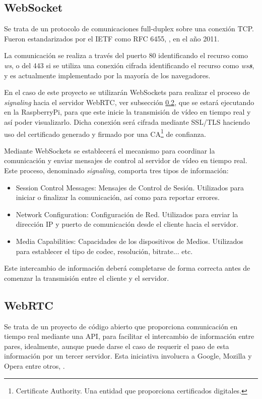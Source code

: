 \subsection{WebSocket}
\label{subsec:WebSocket}
Se trata de un protocolo de comunicaciones full-duplex sobre una conexión TCP. Fueron estandarizados por el IETF como RFC 6455, \citep{wiki:WebSocket6455, wiki:WebSocketWiki}, en el año 2011.  

La comunicación se realiza a través del puerto 80 identificando el recurso como \textit{ws}, o del 443 si se utiliza una conexión cifrada  identificando el recurso como \textit{ws\textbf{s}}, y es actualmente implementado por la mayoría de los navegadores. 

En el caso de este proyecto se utilizarán WebSockets para realizar el proceso de \textit{signaling} hacia el servidor WebRTC, ver subsección \ref{subsec:WebRTC}, que se estará ejecutando en la RaspberryPi, para que este inicie la transmisión de vídeo en tiempo real y así poder visualizarlo. Dicha conexión será cifrada mediante SSL/TLS haciendo uso del certificado generado y firmado por una CA\footnote{Certificate Authority. Una entidad que proporciona certificados digitales.} de confianza.

Mediante WebSockets se establecerá el mecanismo para coordinar la comunicación y enviar mensajes de control al servidor de vídeo en tiempo real. Este proceso, denominado \textit{signaling}, comporta tres tipos de información:
\begin{itemize}
\item Session Control Messages: Mensajes de Control de Sesión. Utilizados para iniciar o finalizar la comunicación, así como para reportar errores.
\item Network Configuration: Configuración de Red. Utilizados para enviar la dirección IP y puerto de comunicación desde el cliente hacia el servidor.
\item Media Capabilities: Capacidades de los dispositivos de Medios. Utilizados para establecer el tipo de codec, resolución, bitrate... etc.
\end{itemize}

Este intercambio de información deberá completarse de forma correcta antes de comenzar la transmisión entre el cliente y el servidor. 


\subsection{WebRTC}
\label{subsec:WebRTC}
Se trata de un proyecto de código abierto que proporciona comunicación en tiempo real mediante una API, para facilitar el intercambio de información entre pares, idealmente, aunque puede darse el caso de requerir el paso de esta información por un tercer servidor. Esta iniciativa involucra a Google, Mozilla y Opera entre otros, \citep{wiki:WebRTCorg, wiki:WebRTCmdn}.

